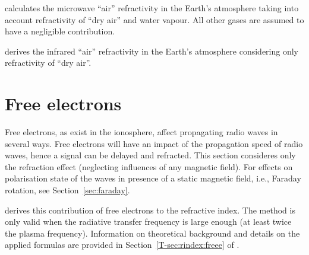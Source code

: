  calculates the microwave ``air''
refractivity in the Earth's atmosphere taking into account refractivity of
``dry air'' and water vapour. All other gases are assumed to have a negligible
contribution. 

 derives the infrared ``air'' refractivity in the
Earth's atmosphere considering only refractivity of ``dry air''. 

\section{Free electrons}
 \label{sec:rindex:freee}
%
Free electrons, as exist in the ionosphere, affect propagating radio waves
in several ways. Free electrons will have an impact of the propagation speed of
radio waves, hence a signal can be delayed and refracted. This section
consideres only the refraction effect (neglecting influences of any magnetic
field). For effects on polarisation state of the
waves in presence of a static magnetic field, i.e., Faraday rotation, see
Section~\ref{sec:faraday}.

 derives this contribution of free
electrons to the refractive index. The method is only valid when the radiative
transfer frequency is large enough (at least twice the plasma frequency).
Information on theoretical background and details on the applied formulas are
provided in Section~\ref{T-sec:rindex:freee} of \theory.


